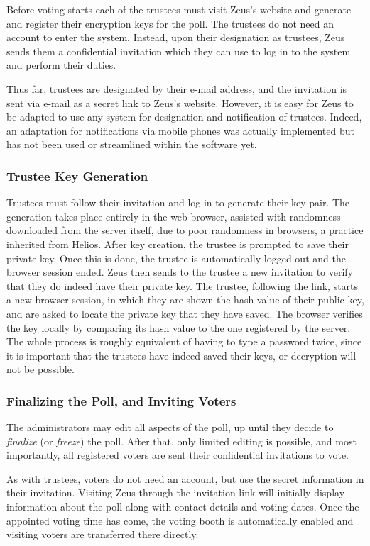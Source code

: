 \documentclass[letterpaper,10pt]{article}
\begin{document}
Before voting starts each of the trustees must visit Zeus's website
and generate and register their encryption keys for the poll.
The trustees do not need an account to enter the system.
Instead, upon their designation as trustees, Zeus sends them a
confidential invitation which they can use to log in to the system
and perform their duties.

Thus far, trustees are designated by their e-mail address, and the
invitation is sent via e-mail as a secret link to Zeus's website.
However, it is easy for Zeus to be adapted to use any system for
designation and notification of trustees. Indeed, an adaptation 
for notifications via mobile phones was actually implemented but
has not been used or streamlined within the software yet.

\subsubsection{Trustee Key Generation}
Trustees must follow their invitation and log in to generate their key
pair. The generation takes place entirely in the web browser, assisted
with randomness downloaded from the server itself, due to poor
randomness in browsers, a practice inherited from Helios. After key
creation, the trustee is prompted to save their private key. Once this
is done, the trustee is automatically logged out and the browser
session ended. Zeus then sends to the trustee a new invitation to
verify that they do indeed have their private key. The trustee,
following the link, starts a new browser session, in which they are
shown the hash value of their public key, and are asked to
locate the private key that they have saved. The browser verifies
the key locally by comparing its hash value to the one registered by
the server. The whole process is roughly equivalent of having to type
a password twice, since it is important that the trustees have indeed
saved their keys, or decryption will not be possible.

\subsubsection{Finalizing the Poll, and Inviting Voters}
The administrators may edit all aspects of the poll, up until they
decide to \emph{finalize} (or \emph{freeze}) the poll.
After that, only limited editing is possible, and most importantly,
all registered voters are sent their confidential invitations to vote.

As with trustees, voters do not need an account, but use the secret
information in their invitation.
Visiting Zeus through the invitation link will initially display
information about the poll along with contact details and voting dates.
Once the appointed voting time has come, the voting booth is
automatically enabled and visiting voters are transferred there directly.
\end{document}
